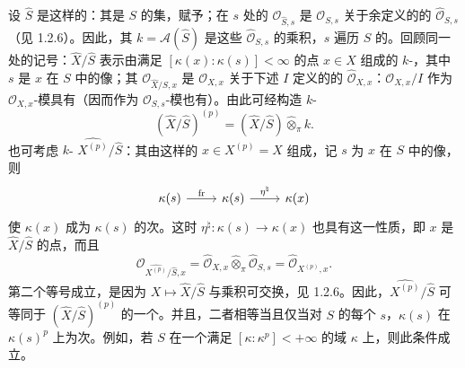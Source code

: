 设 $\widehat S$ 是这样的：其是 $S$ 的集，赋予；在 $s$ 处的 $\mathcal O_{\widehat S,s}$ 是 $\mathcal O_{S,s}$ 关于余定义的的 $\widehat{\mathcal O}_{S,s}$（见 1.2.6）。因此，其 $k=\mathcal A(\widehat S)$ 是这些 $\widehat{\mathcal O}_{S,s}$ 的乘积，$s$ 遍历 $S$ 的。回顾同一处的记号：$\widehat X/\widehat S$ 表示由满足 $[\kappa(x):\kappa(s)]<\infty$ 的点 $x\in X$ 组成的 $k$-，其中 $s$ 是 $x$ 在 $S$ 中的像；其 $\mathcal O_{\widehat X/\widehat S,x}$ 是 $\mathcal O_{X,x}$ 关于下述 $I$ 定义的的 $\widehat{\mathcal O}_{X,x}$：$\mathcal O_{X,x}/I$ 作为 $\mathcal O_{X,x}$-模具有（因而作为 $\mathcal O_{S,s}$-模也有）。由此可经构造 $k$-
\[
(\widehat X/\widehat S)^{(p)}=(\widehat X/\widehat S)\widehat\otimes_\pi k.
\]
也可考虑 $k$- $\widehat{X^{(p)}}/\widehat S$：其由这样的 $x\in X^{(p)}=X$ 组成，记 $s$ 为 $x$ 在 $S$ 中的像，则
\[
\begin{tikzcd}\kappa(s)\arrow[r,"\operatorname{fr}"]&\kappa(s)\arrow[r,"\eta^\natural"]&\kappa(x)\end{tikzcd}
\]
使 $\kappa(x)$ 成为 $\kappa(s)$ 的次。这时 $\eta^\natural:\kappa(s)\to\kappa(x)$ 也具有这一性质，即 $x$ 是 $\widehat X/\widehat S$ 的点，而且
\[
\mathcal O_{\widehat{X^{(p)}}/\widehat S,x}
=\widehat{\mathcal O}_{X,x}\widehat\otimes_\pi\widehat{\mathcal O}_{S,s}
=\widehat{\mathcal O}_{X^{(p)},x}.
\]
第二个等号成立，是因为 $X\mapsto\widehat X/\widehat S$ 与乘积可交换，见 1.2.6。因此，$\widehat{X^{(p)}}/\widehat S$ 可等同于 $(\widehat X/\widehat S)^{(p)}$ 的一个。并且，二者相等当且仅当对 $S$ 的每个 $s$，$\kappa(s)$ 在 $\kappa(s)^p$ 上为次。例如，若 $S$ 在一个满足 $[\kappa:\kappa^p]<+\infty$ 的域 $\kappa$ 上，则此条件成立。

